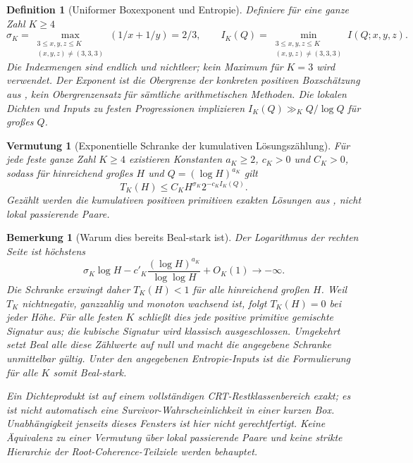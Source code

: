 \documentclass[11pt,a4paper]{article}
\newtheorem{conjecture}[theorem]{Vermutung}
\newtheorem{definition}[theorem]{Definition}
\newtheorem{remark}[theorem]{Bemerkung}
\begin{document}
\begin{definition}[Uniformer Boxexponent und Entropie]
\label{def:sigmaK}
Definiere für eine ganze Zahl $K\ge4$
\[
 \sigma_K=\max_{\substack{3\le x,y,z\le K\\(x,y,z)\ne(3,3,3)}}
                       (1/x+1/y)=2/3,\qquad
 I_K(Q)=\min_{\substack{3\le x,y,z\le K\\(x,y,z)\ne(3,3,3)}}
                       I(Q;x,y,z).
\]
Die Indexmengen sind endlich und nichtleer; kein Maximum für $K=3$
wird verwendet. Der Exponent ist die Obergrenze der konkreten
positiven Boxschätzung aus , kein Obergrenzensatz
für sämtliche arithmetischen Methoden.
Die lokalen Dichten und Inputs zu festen Progressionen implizieren
$I_K(Q)\gg_K Q/\log Q$ für großes $Q$.
\end{definition}

\begin{conjecture}[Exponentielle Schranke der kumulativen Lösungszählung]
\label{conj:exp}
Für jede feste ganze Zahl $K\ge4$ existieren Konstanten $a_K\ge2$,
$c_K>0$ und $C_K>0$, sodass für hinreichend großes $H$ und
$Q=(\log H)^{a_K}$ gilt
\[
 T_K(H)\le C_K H^{\sigma_K}2^{-c_K I_K(Q)}.
\]
Gezählt werden die kumulativen positiven primitiven exakten Lösungen
aus , nicht lokal passierende Paare.
\end{conjecture}

\begin{remark}[Warum dies bereits Beal-stark ist]
Der Logarithmus der rechten Seite ist höchstens
\[
 \sigma_K\log H-c'_K
       \frac{(\log H)^{a_K}}{\log\log H}+O_K(1)\longrightarrow-\infty.
\]
Die Schranke erzwingt daher $T_K(H)<1$ für alle hinreichend großen
$H$. Weil $T_K$ nichtnegativ, ganzzahlig und monoton wachsend ist,
folgt $T_K(H)=0$ bei \emph{jeder} Höhe.
Für alle festen $K$ schließt dies jede positive primitive gemischte
Signatur aus; die kubische Signatur wird klassisch ausgeschlossen.
Umgekehrt setzt Beal alle diese Zählwerte auf null und macht die
angegebene Schranke unmittelbar gültig. Unter den angegebenen
Entropie-Inputs ist die Formulierung für alle $K$ somit Beal-stark.

Ein Dichteprodukt ist auf einem vollständigen CRT-Restklassenbereich
exakt; es ist nicht automatisch eine Survivor-Wahrscheinlichkeit
in einer kurzen Box. Unabhängigkeit jenseits dieses Fensters ist
hier nicht gerechtfertigt. Keine Äquivalenz zu einer Vermutung
über lokal passierende Paare und keine strikte Hierarchie der
Root-Coherence-Teilziele werden behauptet.
\end{remark}
\end{document}

